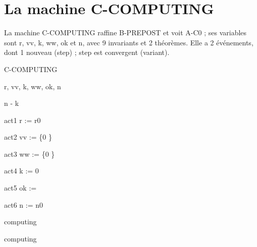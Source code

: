 \documentclass[11pt,a4paper]{article}
\begin{document}
\section{La machine C-COMPUTING}

La machine \textsf{C-COMPUTING} raffine \textsf{B-PREPOST} et voit \textsf{A-C0} ; ses variables sont \textsf{r}, \textsf{vv}, \textsf{k}, \textsf{ww}, \textsf{ok} et \textsf{n}, avec 9 invariants et 2 théorèmes. Elle a 2 événements, dont 1 nouveau (\textsf{step}) ; \textsf{step} est convergent (variant).

\begin{machine}{C-COMPUTING}
  \begin{variables}{r, vv, k, ww, ok, n}
  \end{variables}
  \begin{variant}[vrn1] n - k \end{variant}
  \begin{initialisation}
    \begin{action}{act1} r := r0 \end{action}
    \begin{action}{act2} vv := \{0 \} \end{action}
    \begin{action}{act3} ww := \{0 \} \end{action}
    \begin{action}{act4} k := 0 \end{action}
    \begin{action}{act5} ok := \False \end{action}
    \begin{action}{act6} n := n0 \end{action}
  \end{initialisation}
  \begin{event}{computing}
    \begin{refines} computing \end{refines}

\end{event}
\end{machine}
\end{document}
